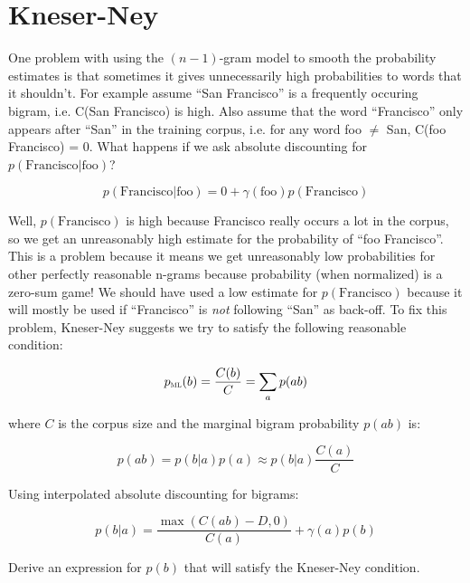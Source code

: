 \documentclass[a4paper]{article}
\newcommand{\pml}{p_{\textsc{ml}}}
\begin{document}
\newpage
\section{Kneser-Ney}

One problem with using the $(n-1)$-gram model to smooth the
probability estimates is that sometimes it gives unnecessarily high
probabilities to words that it shouldn't.  For example assume ``San
Francisco'' is a frequently occuring bigram, i.e. C(San Francisco) is
high.  Also assume that the word ``Francisco'' only appears after
``San'' in the training corpus, i.e. for any word foo $\neq$ San,
C(foo Francisco) = 0.  What happens if we ask absolute discounting for
$p(\mbox{Francisco} | \mbox{foo})$?

\[ p(\mbox{Francisco} | \mbox{foo}) = 0 + \gamma(\mbox{foo})
p(\mbox{Francisco}) \]

Well, $p(\mbox{Francisco})$ is high because Francisco really occurs a
lot in the corpus, so we get an unreasonably high estimate for the
probability of ``foo Francisco''.  This is a problem because it means
we get unreasonably low probabilities for other perfectly reasonable
n-grams because probability (when normalized) is a zero-sum game!  We
should have used a low estimate for $p(\mbox{Francisco})$ because it
will mostly be used if ``Francisco'' is {\em not} following ``San'' as
back-off.  To fix this problem, Kneser-Ney suggests we try to satisfy
the following reasonable condition:

\[ \pml(b) = \frac{C(b)}{C} = \sum_a p(ab) \]

where $C$ is the corpus size and the marginal bigram probability
$p(ab)$ is:

\[ p(ab) = p(b|a) p(a) \approx p(b|a) \frac{C(a)}{C} \]

Using interpolated absolute discounting for bigrams:

\[ p(b|a) = \frac{\max(C(ab) - D, 0)}{C(a)} + \gamma(a) p(b) \]

Derive an expression for $p(b)$ that will satisfy the Kneser-Ney
condition.
\end{document}
